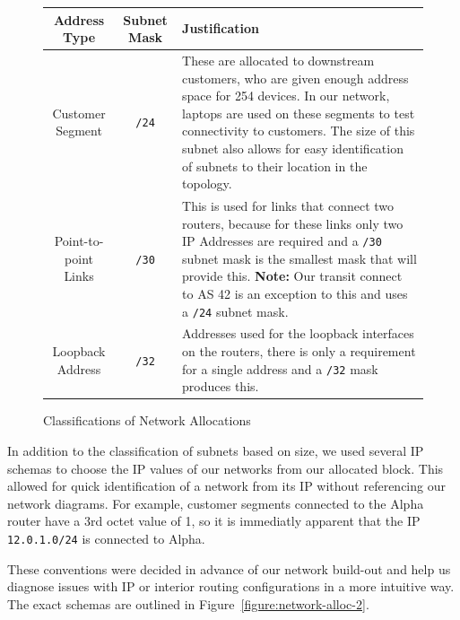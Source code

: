 \begin{figure}[!ht]
    \caption{Classifications of Network Allocations}
    \label{figure:network-alloc-1}
    \centering
    \begin{tabular}{|c|c|p{5.5cm}|}

        \hline
        \textbf{Address Type} & \textbf{Subnet Mask} & \textbf{Justification} \\

        \hline
        Customer Segment & \texttt{/24} & These are allocated to
        downstream customers, who are given enough address space for 254
        devices. In our network, laptops are used on these segments to test
        connectivity to customers. The size of this subnet also allows for easy
        identification of subnets to their location in the topology.\\

        \hline
        Point-to-point Links & \texttt{/30} & This is used for links that
        connect two routers, because for these links only two IP Addresses are
        required and a \texttt{/30} subnet mask is the smallest mask that will
        provide this. \textbf{Note:} Our transit connect to AS 42 is an
        exception to this and uses a \texttt{/24} subnet mask.\\

        \hline
        Loopback Address & \texttt{/32} & Addresses used for the loopback
        interfaces on the routers, there is only a requirement for a single
        address and a \texttt{/32} mask produces this.\\

        \hline
    \end{tabular}
\end{figure}
In addition to the classification of subnets based on size, we used several IP
schemas to choose the IP values of our networks from our allocated block. This
allowed for quick identification of a network from its IP without referencing
our network diagrams. For example, customer segments connected to the Alpha
router have a 3rd octet value of 1, so it is immediatly apparent that the IP
\texttt{12.0.1.0/24} is connected to Alpha.

These conventions were decided in advance of our network build-out and help us
diagnose issues with IP or interior routing configurations in a more intuitive
way. The exact schemas are outlined in Figure~\ref{figure:network-alloc-2}.

